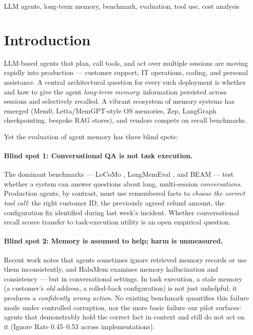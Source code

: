 \documentclass[journal]{IEEEtran}
\begin{document}
\begin{IEEEkeywords}
LLM agents, long-term memory, benchmark, evaluation, tool use, cost analysis
\end{IEEEkeywords}

\IEEEpeerreviewmaketitle

\section{Introduction}

LLM-based agents that plan, call tools, and act over multiple sessions are
moving rapidly into production --- customer support, IT operations, coding, and
personal assistance. A central architectural question for every such
deployment is whether and how to give the agent \emph{long-term memory}:
information persisted across sessions and selectively recalled. A vibrant
ecosystem of memory systems has emerged (Mem0, Letta/MemGPT-style OS
memories, Zep, LangGraph checkpointing, bespoke RAG stores), and vendors
compete on recall benchmarks.

Yet the evaluation of agent memory has three blind spots:

\paragraph{Blind spot 1: Conversational QA is not task execution.}
The dominant benchmarks --- LoCoMo \cite{locomo}, LongMemEval \cite{longmemeval},
and BEAM \cite{beam} --- test whether a system can answer questions about
long, multi-session \emph{conversations}. Production agents, by contrast,
must use remembered facts to \emph{choose the correct tool call}: the right
customer ID, the previously agreed refund amount, the configuration fix
identified during last week's incident. Whether conversational recall scores
transfer to task-execution utility is an open empirical question.

\paragraph{Blind spot 2: Memory is assumed to help; harm is unmeasured.}
Recent work notes that agents sometimes ignore retrieved memory records or
use them inconsistently, and HaluMem \cite{halumem} examines memory
hallucination and consistency --- but in conversational settings. In task
execution, a stale memory (a customer's \emph{old} address, a rolled-back
configuration) is not just unhelpful; it produces a \emph{confidently wrong
action}. No existing benchmark quantifies this failure mode under controlled
corruption, nor the more basic failure our pilot surfaces: agents that
demonstrably hold the correct fact in context and still do not act on it
(Ignore Rate 0.45--0.53 across implementations).
\end{document}
